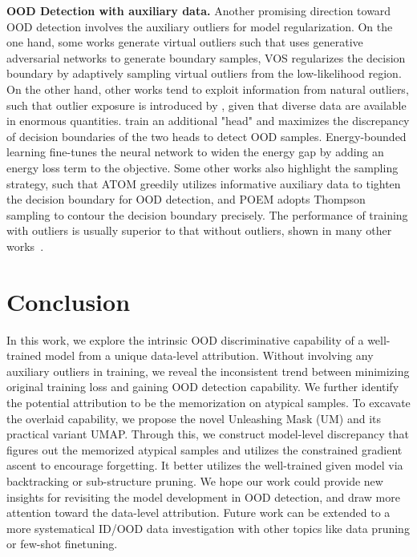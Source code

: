 \documentclass{article}
\theoremstyle{plain}
\theoremstyle{definition}
\theoremstyle{remark}
\begin{document}
\textbf{OOD Detection with auxiliary data.} Another promising direction toward OOD detection involves the auxiliary outliers for model regularization. On the one hand, some works generate virtual outliers such that \citet{LeeLLS18} uses generative adversarial networks to generate boundary samples, VOS \citep{du2022vos} regularizes the decision boundary by adaptively sampling virtual outliers from the low-likelihood region. On the other hand, other works tend to exploit information from natural outliers, such that outlier exposure is introduced by \citet{hendrycks2018deep}, given that diverse data are available in enormous quantities. \citep{DBLP:conf/iccv/YuA19} train an additional "head" and maximizes the discrepancy of decision boundaries of the two heads to detect OOD samples. Energy-bounded learning \citep{liu2020energy} fine-tunes the neural network to widen the energy gap by adding an energy loss term to the objective. Some other works also highlight the sampling strategy, such that ATOM \citep{chen2021atom} greedily utilizes informative auxiliary data to tighten the decision boundary for OOD detection, and POEM \citep{ming2022poem} adopts Thompson sampling to contour the decision boundary precisely. The performance of training with outliers is usually superior to that without outliers, shown in many other works~\citep{liu2020energy, fort2021exploring, sun2021react, SehwagCM21, chen2021atom,salehi2021unified, wei2022logitnorm}.

\section{Conclusion}

In this work, we explore the intrinsic OOD discriminative capability of a well-trained model from a unique data-level attribution. Without involving any auxiliary outliers in training, we reveal the inconsistent trend between minimizing original training loss and gaining OOD detection capability. We further identify the potential attribution to be the memorization on atypical samples. To excavate the overlaid capability, we propose the novel Unleashing Mask (UM) and its practical variant UMAP. Through this, we construct model-level discrepancy that figures out the memorized atypical samples and utilizes the constrained gradient ascent to encourage forgetting. It better utilizes the well-trained given model via backtracking or sub-structure pruning. We hope our work could provide new insights for revisiting the model development in OOD detection, and draw more attention toward the data-level attribution. Future work can be extended to a more systematical ID/OOD data investigation with other topics like data pruning or few-shot finetuning.
\end{document}
